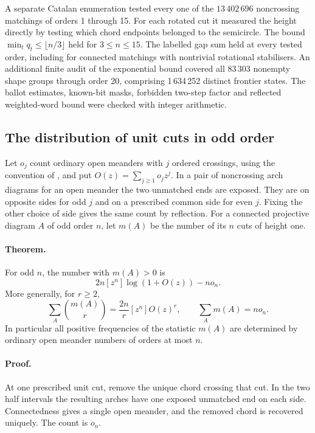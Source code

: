 A separate Catalan enumeration tested every one of the \(13\,402\,696\)
noncrossing matchings of orders 1 through 15. For each rotated cut it
measured the height directly by testing which chord endpoints belonged to
the semicircle. The bound \(\min_t q_t\le\lfloor n/3\rfloor\) held
for \(3\le n\le15\). The labelled gap sum held at every tested order,
including for connected matchings with nontrivial rotational stabilisers.
An additional finite audit of the exponential bound covered
all 83\,303 nonempty shape groups through order 20, comprising 1\,634\,252
distinct frontier states. The ballot estimates, known-bit masks, forbidden
two-step factor and reflected weighted-word bound were checked with
integer arithmetic.

\subsection{The distribution of unit cuts in odd order}
\label{sec:unit-cuts}

Let \(o_j\) count ordinary open meanders with \(j\) ordered crossings,
using the convention of \cite[\S1]{lz}, and put
\(O(z)=\sum_{j\ge1}o_jz^j\). In a pair of noncrossing arch diagrams for an
open meander the two unmatched ends are exposed. They are on opposite sides
for odd \(j\) and on a prescribed common side for even \(j\). Fixing the
other choice of side gives the same count by reflection.
For a connected projective diagram \(A\) of odd order \(n\), let \(m(A)\)
be the number of its \(n\) cuts of height one.

\paragraph{Theorem.}
For odd \(n\), the number with \(m(A)>0\) is
\[
 2n[z^n]\log(1+O(z))-n o_n .
\]
More generally, for \(r\ge2\),
\[
 \sum_A\binom{m(A)}r=\frac{2n}{r}[z^n]O(z)^r,
 \qquad \sum_A m(A)=n o_n .
\]
In particular all positive frequencies of the statistic \(m(A)\) are
determined by ordinary open meander numbers of orders at most \(n\).

\paragraph{Proof.}
At one prescribed unit cut, remove the unique chord crossing that cut.
In the two half intervals the resulting arches have one exposed unmatched
end on each side. Connectedness gives a single open meander, and the removed
chord is recovered uniquely. The count is \(o_n\).

